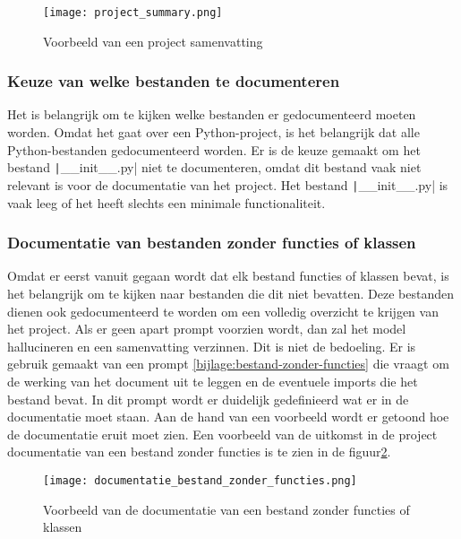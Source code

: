 \begin{figure}[h]
    \centering
    \texttt{[image: project\_summary.png]}
    \caption{Voorbeeld van een project samenvatting}
    \label{fig:project-summary}
\end{figure}    

\subsubsection{Keuze van welke bestanden te documenteren}
\label{subsec:project-documentatie-keuze-bestanden}

Het is belangrijk om te kijken welke bestanden er gedocumenteerd moeten worden.
Omdat het gaat over een Python-project, is het belangrijk dat alle Python-bestanden gedocumenteerd worden.
Er is de keuze gemaakt om het bestand \texttt|__init__.py| niet te documenteren, omdat dit bestand vaak niet relevant is voor de documentatie van het project.
Het bestand \texttt|__init__.py| is vaak leeg of het heeft slechts een minimale functionaliteit. 

\subsubsection{Documentatie van bestanden zonder functies of klassen}
\label{subsec:project-documentatie-geen-functies}

Omdat er eerst vanuit gegaan wordt dat elk bestand functies of klassen bevat, is het belangrijk om te kijken naar bestanden die dit niet bevatten.
Deze bestanden dienen ook gedocumenteerd te worden om een volledig overzicht te krijgen van het project.
Als er geen apart prompt voorzien wordt, dan zal het model hallucineren en een samenvatting verzinnen. Dit is niet de bedoeling.
Er is gebruik gemaakt van een prompt \ref{bijlage:bestand-zonder-functies} die vraagt om de werking van het document uit te leggen en de eventuele imports die het bestand bevat.
In dit prompt wordt er duidelijk gedefinieerd wat er in de documentatie moet staan. 
Aan de hand van een voorbeeld wordt er getoond hoe de documentatie eruit moet zien.
Een voorbeeld van de uitkomst in de project documentatie van een bestand zonder functies is te zien in de figuur\ref{fig:file-no-functions}.

\begin{figure}[h]
    \centering
    \texttt{[image: documentatie\_bestand\_zonder\_functies.png]}
    \caption{Voorbeeld van de documentatie van een bestand zonder functies of klassen}
    \label{fig:file-no-functions}
\end{figure}

